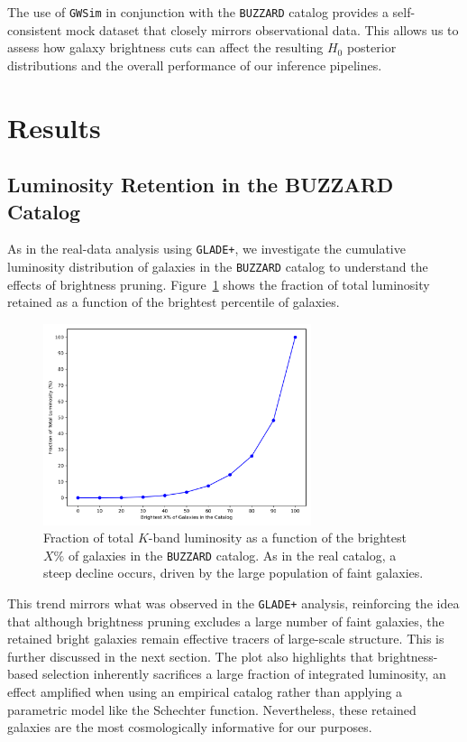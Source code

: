 The use of \texttt{\texttt{GWSim}} in conjunction with the \texttt{BUZZARD} catalog provides a self-consistent mock dataset that closely mirrors observational data. This allows us to assess how galaxy brightness cuts can affect the resulting $H_0$ posterior distributions and the overall performance of our inference pipelines.

\section{Results}

\subsection{Luminosity Retention in the BUZZARD Catalog}

As in the real-data analysis using \texttt{GLADE+}, we investigate the cumulative luminosity distribution of galaxies in the \texttt{BUZZARD} catalog to understand the effects of brightness pruning. Figure~\ref{fig:luminosity_buzzard} shows the fraction of total luminosity retained as a function of the brightest percentile of galaxies.

\begin{figure}[h]
    \centering
    \includegraphics[width=0.7\textwidth]{figures/luminosity_fraction_vs_percentile_BUZZARD.png}
    \caption[\texttt{BUZZARD} luminosity retention.]{Fraction of total $K$-band luminosity as a function of the brightest $X\%$ of galaxies in the \texttt{BUZZARD} catalog. As in the real catalog, a steep decline occurs, driven by the large population of faint galaxies.\footnotemark}
    \label{fig:luminosity_buzzard}
\end{figure}

This trend mirrors what was observed in the \texttt{GLADE+} analysis, reinforcing the idea that although brightness pruning excludes a large number of faint galaxies, the retained bright galaxies remain effective tracers of large-scale structure. This is further discussed in the next section. The plot also highlights that brightness-based selection inherently sacrifices a large fraction of integrated luminosity, an effect amplified when using an empirical catalog rather than applying a parametric model like the Schechter function. Nevertheless, these retained galaxies are the most cosmologically informative for our purposes.


